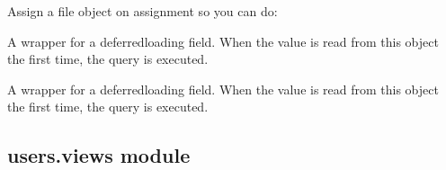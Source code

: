\documentclass[letterpaper,10pt,english]{sphinxmanual}
\begin{document}
\begin{fulllineitems}
\begin{fulllineitems}
\sphinxAtStartPar
Assign a file object on assignment so you can do:

\begin{sphinxVerbatim}[commandchars=\\\{\}]
   
      
\end{sphinxVerbatim}

\end{fulllineitems}


\begin{fulllineitems}
\label{\detokenize{users:users.models.studentsubmissions.status}}
\sphinxAtStartPar
A wrapper for a deferred\sphinxhyphen{}loading field. When the value is read from this
object the first time, the query is executed.

\end{fulllineitems}


\begin{fulllineitems}
\label{\detokenize{users:users.models.studentsubmissions.username}}
\sphinxAtStartPar
A wrapper for a deferred\sphinxhyphen{}loading field. When the value is read from this
object the first time, the query is executed.

\end{fulllineitems}


\end{fulllineitems}



\subsection{users.views module}
\label{\detokenize{users:module-users.views}}\label{\detokenize{users:users-views-module}}
\end{document}
